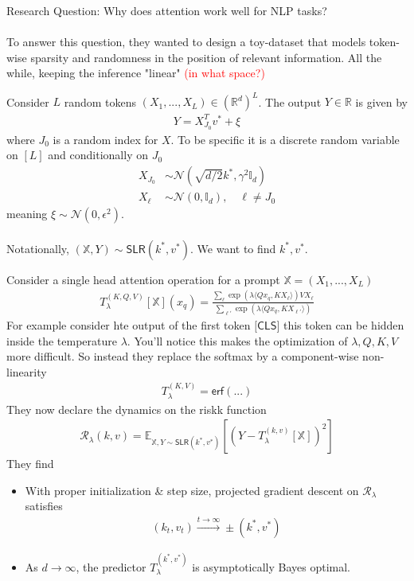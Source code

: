 \documentclass[11pt,fleqn]{article}
\numberwithin{equation}{section}
\theoremstyle{definition}
\theoremstyle{definition}
\begin{document}
Research Question: Why does attention work well for NLP tasks? \\
\\
To answer this question, they wanted to design a toy-dataset that models token-wise sparsity and randomness in the position of relevant information. All the while, keeping the inference "linear" \textcolor{red}{(in what space?)}
\begin{definition}
	 Consider $L$ random tokens $(X_1, ..., X_L) \in (\mathbb R^{d})^L$. The output $Y \in \mathbb R$ is given by
	\begin{align}
		Y = X_{J_0}^T v^* + \xi
	\end{align}
	where $J_0$ is a random index for $X$. To be specific it is a discrete random variable on $[L]$ and conditionally on $J_0$
	\begin{align}
		X_{J_0} & \sim \mathcal N \left( \sqrt{d/2} k^*, \gamma^2 \mathbb I_d \right)\\
		X_\ell & \sim \mathcal N(0, \mathbb I_d), \quad \ell \neq J_0
	\end{align}
	meaning $\xi \sim \mathcal N(0, \epsilon^2)$.\\
	\\
	Notationally, $(\mathbb X, Y) \sim \textsf{SLR}(k^*, v^*)$. We want to find $k^*, v^*$.
\end{definition}
Consider a single head attention operation for a prompt $\mathbb X = (X_1, ..., X_L)$
\begin{align}
	T_\lambda^{(K,Q,V)}[\mathbb X](x_{q}) = \frac{\sum_\ell \exp \left( \lambda \langle Q x_q, K X_\ell \rangle \right) V X_\ell}{\sum_{\ell'} \exp \left( \lambda \langle Q x_q, K X_{\ell'} \rangle \right)}
\end{align}
For example consider hte output of the first token $\textsf{[CLS]}$ this token can be hidden inside the temperature $\lambda$. You'll notice this makes the optimization of $\lambda, Q, K ,V$ more difficult. So instead they replace the softmax by a component-wise non-linearity
\begin{align}
	T_\lambda^{(K,V)} = \textsf{erf}(...)
\end{align}
They now declare the dynamics on the riskk function
\begin{align}
	\mathcal R_\lambda(k, v) = \mathbb E_{\mathbb X, Y \sim \textsf{SLR}(k^*, v^*)} \left[ \left( Y - T_\lambda^{(k,v)}[\mathbb X] \right)^2 \right]
\end{align}
They find
\begin{fact}
	[Informal] 
	\begin{itemize}
		\item With proper initialization \& step size, projected gradient descent on $\mathcal R_\lambda$ satisfies
	\begin{align}
		(k_t, v_t) \overset{t \to \infty}{\to} \pm (k^*, v^*)
	\end{align}
	\item As $d \to \infty$, the predictor $T_\lambda^{(k^*, v^*)}$ is asymptotically Bayes optimal.
	\end{itemize}
\end{fact}
\end{document}
